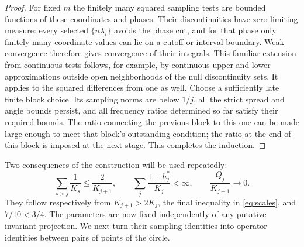 \begin{proof}
For fixed $m$ the finitely many squared sampling tests are bounded
functions of these coordinates and phases.  Their discontinuities
have zero limiting measure: every selected $\{n\lambda_i\}$ avoids
the phase cut, and for that phase only finitely many coordinate values
can lie on a cutoff or interval boundary.  Weak convergence therefore
gives convergence of their integrals.  This familiar extension from
continuous tests follows, for example, by continuous upper and lower
approximations outside open neighborhoods of the null discontinuity
sets.  It applies to the squared differences from one as well.
Choose a sufficiently late finite block choice.  Its sampling norms
are below $1/j$, all the strict spread and angle bounds persist, and
all frequency ratios determined so far satisfy their required bounds.
The ratio connecting
the previous block to this one can be made large enough to meet that
block's outstanding condition; the ratio at the end of this block
is imposed at the next stage.  This completes the induction.
\end{proof}

Two consequences of the construction will be used repeatedly:
\begin{equation}\label{eq:tail-sizes}
 \sum_{s>j}\frac1{K_s}\le\frac2{K_{j+1}},\qquad
 \sum_j\frac{1+h_j^*}{K_j}<\infty,\qquad
 \frac{Q_j}{K_{j+1}}\longrightarrow0.
\end{equation}
They follow respectively from $K_{j+1}>2K_j$, the final inequality in
\eqref{eq:scales}, and $7/10<3/4$.
The parameters are now fixed independently of any putative invariant
projection.  We next turn their sampling identities into operator
identities between pairs of points of the circle.
